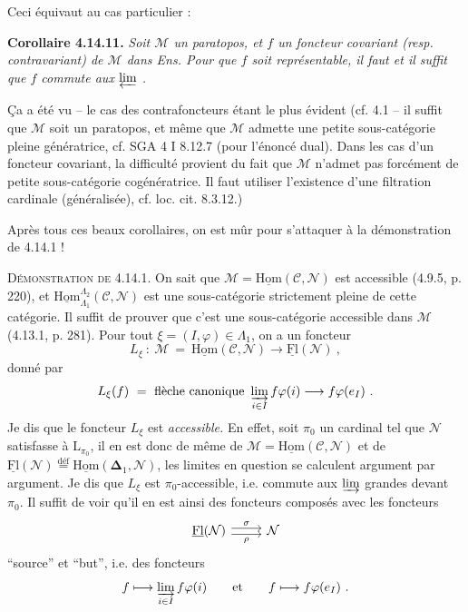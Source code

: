 \documentclass[11pt]{article}
\newcommand{\msp}[1]{\marginpar{\footnotesize [#1]}}
\newcommand{\defeq}{\overset{\text{déf}}{=}}
\newcommand{\uHom}{\underline{\mathrm{Hom}}}
\newcommand{\uFl}{\underline{\mathrm{Fl}}}
\begin{document}
\msp{page 380}
Ceci équivaut au cas particulier :

\textbf{Corollaire 4.14.11.} \textit{Soit $\mathcal{M}$ un paratopos, et $f$ un foncteur covariant (resp. contravariant) de $\mathcal{M}$ dans \textup{Ens}. Pour que $f$ soit représentable, il faut et il suffit que $f$ commute aux $\varprojlim$ .}

Ça a été vu -- le cas des contrafoncteurs étant le plus évident (cf. 4.1 -- il suffit que $\mathcal{M}$ soit un paratopos, et même que $\mathcal{M}$ admette une petite sous-catégorie pleine génératrice, cf. SGA 4 I 8.12.7 (pour l'énoncé dual). Dans les cas d'un foncteur covariant, la difficulté provient du fait que $\mathcal{M}$ n'admet pas forcément de petite sous-catégorie cogénératrice. Il faut utiliser l'existence d'une filtration cardinale (généralisée), cf. loc. cit. 8.3.12.) %

Après tous ces beaux corollaires, on est mûr pour s'attaquer à la démonstration de 4.14.1 !

\msp{page 381}
\textsc{Démonstration de} 4.14.1. On sait que $\mathcal{M} = \uHom(\mathcal{C},\mathcal{N})$ est accessible (4.9.5, p. 220), et $\uHom^{\Lambda_2}_{\Lambda_1}(\mathcal{C},\mathcal{N})$ est une sous-catégorie strictement pleine de cette catégorie. Il suffit de prouver que c'est une sous-catégorie accessible dans $\mathcal{M}$ (4.13.1, p. 281). Pour tout $\xi = (I,\varphi) \in \Lambda_1$, on a un foncteur
\[
L_\xi \ : \ \mathcal{M} \ = \ \uHom(\mathcal{C},\mathcal{N}) \longrightarrow \uFl(\mathcal{N}) \ ,
\]
donné par
\[
L_\xi(f) \ = \ \text{flèche canonique } \varinjlim_{i\in I} f\varphi(i) \longrightarrow f\varphi(e_I) \ .
\]
Je dis que le foncteur $L_\xi$ est \textit{accessible.} En effet, soit $\pi_0$ un cardinal tel que $\mathcal{N}$ satisfasse à $\mathrm{L}_{\pi_0}$, il en est donc de même de $\mathcal{M} = \uHom(\mathcal{C},\mathcal{N})$ et de $\uFl(\mathcal{N}) \defeq \uHom(\boldsymbol{\Delta}_1,\mathcal{N})$, les limites en question se calculent argument par argument. Je dis que $L_\xi$ est $\pi_0$-accessible, i.e. commute aux $\varinjlim$ grandes devant $\pi_0$. Il suffit de voir qu'il en est ainsi des foncteurs composés avec les foncteurs
\[
\begin{tikzcd}
\uFl(\mathcal{N}) \arrow[r, shift left, "\sigma"] \arrow[r, shift right, "\rho"'] & \mathcal{N}
\end{tikzcd}
\]
``source'' et ``but'', i.e. des foncteurs
\[
f \longmapsto \varinjlim_{i\in I} f\varphi(i) \qquad \text{et} \qquad f \longmapsto f\varphi(e_I) \ .
\]
\end{document}
